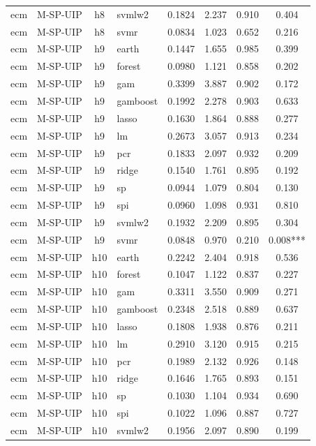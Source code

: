 \begin{ThreePartTable}
\begin{longtable}[t]{llclcccc}
ecm & M-SP-UIP & h8 & svmlw2 & 0.1824 & 2.237 & 0.910 & 0.404\\
ecm & M-SP-UIP & h8 & svmr & 0.0834 & 1.023 & 0.652 & 0.216\\
\addlinespace
ecm & M-SP-UIP & h9 & earth & 0.1447 & 1.655 & 0.985 & 0.399\\
ecm & M-SP-UIP & h9 & forest & 0.0980 & 1.121 & 0.858 & 0.202\\
ecm & M-SP-UIP & h9 & gam & 0.3399 & 3.887 & 0.902 & 0.172\\
ecm & M-SP-UIP & h9 & gamboost & 0.1992 & 2.278 & 0.903 & 0.633\\
ecm & M-SP-UIP & h9 & lasso & 0.1630 & 1.864 & 0.888 & 0.277\\
ecm & M-SP-UIP & h9 & lm & 0.2673 & 3.057 & 0.913 & 0.234\\
ecm & M-SP-UIP & h9 & pcr & 0.1833 & 2.097 & 0.932 & 0.209\\
ecm & M-SP-UIP & h9 & ridge & 0.1540 & 1.761 & 0.895 & 0.192\\
ecm & M-SP-UIP & h9 & sp & 0.0944 & 1.079 & 0.804 & 0.130\\
ecm & M-SP-UIP & h9 & spi & 0.0960 & 1.098 & 0.931 & 0.810\\
ecm & M-SP-UIP & h9 & svmlw2 & 0.1932 & 2.209 & 0.895 & 0.304\\
ecm & M-SP-UIP & h9 & svmr & 0.0848 & 0.970 & 0.210 & 0.008***\\
\addlinespace
ecm & M-SP-UIP & h10 & earth & 0.2242 & 2.404 & 0.918 & 0.536\\
ecm & M-SP-UIP & h10 & forest & 0.1047 & 1.122 & 0.837 & 0.227\\
ecm & M-SP-UIP & h10 & gam & 0.3311 & 3.550 & 0.909 & 0.271\\
ecm & M-SP-UIP & h10 & gamboost & 0.2348 & 2.518 & 0.889 & 0.637\\
ecm & M-SP-UIP & h10 & lasso & 0.1808 & 1.938 & 0.876 & 0.211\\
ecm & M-SP-UIP & h10 & lm & 0.2910 & 3.120 & 0.915 & 0.215\\
ecm & M-SP-UIP & h10 & pcr & 0.1989 & 2.132 & 0.926 & 0.148\\
ecm & M-SP-UIP & h10 & ridge & 0.1646 & 1.765 & 0.893 & 0.151\\
ecm & M-SP-UIP & h10 & sp & 0.1030 & 1.104 & 0.934 & 0.690\\
ecm & M-SP-UIP & h10 & spi & 0.1022 & 1.096 & 0.887 & 0.727\\
ecm & M-SP-UIP & h10 & svmlw2 & 0.1956 & 2.097 & 0.890 & 0.199\\

\end{longtable}
\end{ThreePartTable}
